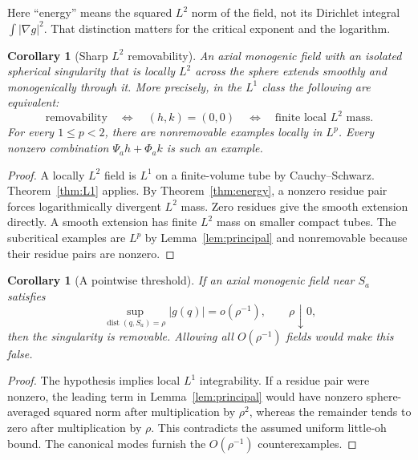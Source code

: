 \documentclass[11pt,a4paper]{article}
\numberwithin{equation}{section}
\newtheorem{corollary}[theorem]{Corollary}
\theoremstyle{definition}
\theoremstyle{remark}
\newcommand{\dist}{\operatorname{dist}}
\begin{document}
Here ``energy'' means the squared $L^2$ norm of the field, not its
Dirichlet integral $\int|\nabla g|^2$. That distinction matters for the
critical exponent and the logarithm.

\begin{corollary}[Sharp $L^2$ removability]\label{cor:L2}
An axial monogenic field with an isolated spherical singularity that is
locally $L^2$ across the sphere extends smoothly and monogenically
through it. More precisely, in the $L^1$ class the following are equivalent:
\[
 \text{removability}\quad\Longleftrightarrow\quad
 (h,k)=(0,0)\quad\Longleftrightarrow\quad
 \text{finite local }L^2\text{ mass}.
\]
For every $1\le p<2$, there are nonremovable examples locally in $L^p$.
Every nonzero combination $\Psi_a h+\Phi_a k$ is such an example.
\end{corollary}
\begin{proof}
A locally $L^2$ field is $L^1$ on a finite-volume tube by
Cauchy--Schwarz. Theorem~\ref{thm:L1} applies. By
Theorem~\ref{thm:energy}, a nonzero residue pair forces logarithmically
divergent $L^2$ mass. Zero residues give the smooth extension directly.
A smooth extension has finite $L^2$ mass on smaller compact tubes.
The subcritical examples are $L^p$ by Lemma~\ref{lem:principal} and
nonremovable because their residue pairs are nonzero.
\end{proof}

\begin{corollary}[A pointwise threshold]\label{cor:pointwise}
If an axial monogenic field near $S_a$ satisfies
\[
 \sup_{\dist(q,S_a)=\rho}|g(q)|=o(\rho^{-1}),\qquad\rho\downarrow0,
\]
then the singularity is removable. Allowing all $O(\rho^{-1})$ fields
would make this false.
\end{corollary}
\begin{proof}
The hypothesis implies local $L^1$ integrability. If a residue pair
were nonzero, the leading term in Lemma~\ref{lem:principal} would have
nonzero sphere-averaged squared norm after multiplication by $\rho^2$,
whereas the remainder tends to zero after multiplication by $\rho$.
This contradicts the assumed uniform little-oh bound. The canonical
modes furnish the $O(\rho^{-1})$ counterexamples.
\end{proof}
\end{document}
